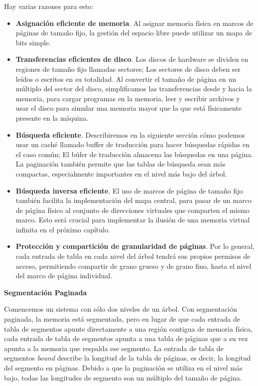 \documentclass[10pt]{book}
\begin{document}
Hay varias razones para esto:
\begin{itemize}
\item \textbf{Asignación eficiente de memoria}. Al asignar memoria física en marcos de páginas de tamaño fijo, la gestión del espacio libre puede utilizar un mapa de bits simple.

\item \textbf{Transferencias eficientes de disco}. Los discos de hardware se dividen en regiones de tamaño fijo llamadas sectores; Los sectores de disco deben ser leídos o escritos en su totalidad. Al convertir el tamaño de página en un múltiplo del sector del disco, simplificamos las transferencias desde y hacia la memoria, para cargar programas en la memoria, leer y escribir archivos y usar el disco para simular una memoria mayor que la que está físicamente presente en la máquina.

\item \textbf{Búsqueda eficiente}. Describiremos en la siguiente sección cómo podemos usar un caché llamado buffer de traducción para hacer búsquedas rápidas en el caso común; El búfer de traducción almacena las búsquedas en una página. La paginación también permite que las tablas de búsqueda sean más compactas, especialmente importantes en el nivel más bajo del árbol.

\item \textbf{Búsqueda inversa eficiente}. El uso de marcos de página de tamaño fijo también facilita la implementación del mapa central, para pasar de un marco de página físico al conjunto de direcciones virtuales que comparten el mismo marco. Esto será crucial para implementar la ilusión de una memoria virtual infinita en el próximo capítulo.

\item \textbf{Protección y compartición de granularidad de páginas}. Por lo general, cada entrada de tabla en cada nivel del árbol tendrá sus propios permisos de acceso, permitiendo compartir de grano grueso y de grano fino, hasta el nivel del marco de página individual.
\end{itemize}

\textbf{Segmentación Paginada}

Comencemos un sistema con sólo dos niveles de un árbol. Con segmentación paginada, la memoria está segmentada, pero en lugar de que cada entrada de tabla de segmentos apunte directamente a una región contigua de memoria física, cada entrada de tabla de segmentos apunta a una tabla de páginas que a su vez apunta a la memoria que respalda ese segmento. La entrada de tabla de segmentos \textit{bound} describe la longitud de la tabla de páginas, es decir, la longitud del segmento en páginas. Debido a que la paginación se utiliza en el nivel más bajo, todas las longitudes de segmento son un múltiplo del tamaño de página.
\end{document}
